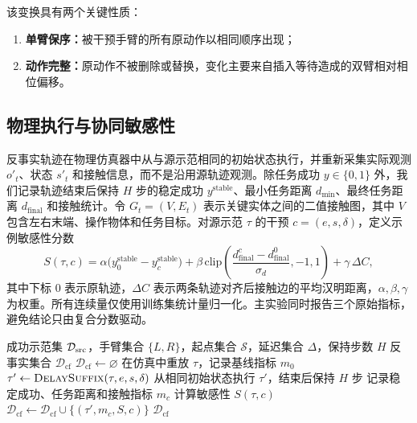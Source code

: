 该变换具有两个关键性质：
\begin{enumerate}
    \item \textbf{单臂保序：}被干预手臂的所有原动作以相同顺序出现；
    \item \textbf{动作完整：}原动作不被删除或替换，变化主要来自插入等待造成的双臂相对相位偏移。
\end{enumerate}

\subsection{物理执行与协同敏感性}

反事实轨迹在物理仿真器中从与源示范相同的初始状态执行，并重新采集实际观测 $o'_t$、状态 $s'_t$ 和接触信息，而不是沿用源轨迹观测。除任务成功 $y\in\{0,1\}$ 外，我们记录轨迹结束后保持 $H$ 步的稳定成功 $y^{\mathrm{stable}}$、最小任务距离 $d_{\min}$、最终任务距离 $d_{\mathrm{final}}$ 和接触统计。令 $G_t=(V,E_t)$ 表示关键实体之间的二值接触图，其中 $V$ 包含左右末端、操作物体和任务目标。对源示范 $\tau$ 的干预 $c=(e,s,\delta)$，定义示例敏感性分数
\begin{equation}
S(\tau,c)=
\alpha\big(y_0^{\mathrm{stable}}-y_c^{\mathrm{stable}}\big)
+\beta\,\mathrm{clip}\left(\frac{d_{\mathrm{final}}^c-d_{\mathrm{final}}^0}{\sigma_d},-1,1\right)
+\gamma\,\Delta C,
\end{equation}
其中下标 $0$ 表示原轨迹，$\Delta C$ 表示两条轨迹对齐后接触边的平均汉明距离，$\alpha,\beta,\gamma$ 为权重。所有连续量仅使用训练集统计量归一化。主实验同时报告三个原始指标，避免结论只由复合分数驱动。

\begin{algorithm}[t]
\caption{协同敏感反事实数据生成}
\label{alg:generation}
\begin{algorithmic}[1]
\Require 成功示范集 $\mathcal{D}_{\mathrm{src}}$，手臂集合 $\{L,R\}$，起点集合 $\mathcal{S}$，延迟集合 $\Delta$，保持步数 $H$
\Ensure 反事实集合 $\mathcal{D}_{\mathrm{cf}}$
\State $\mathcal{D}_{\mathrm{cf}}\gets\varnothing$
\ForAll{$\tau\in\Dsrc$}
    \State 在仿真中重放 $\tau$，记录基线指标 $m_0$
        \State $\tau'\gets\textsc{DelaySuffix}(\tau,e,s,\delta)$
        \State 从相同初始状态执行 $\tau'$，结束后保持 $H$ 步
        \State 记录稳定成功、任务距离和接触指标 $m_c$
        \State 计算敏感性 $S(\tau,c)$
        \State $\mathcal{D}_{\mathrm{cf}}\gets\mathcal{D}_{\mathrm{cf}}\cup\{(\tau',m_c,S,c)\}$
    \EndFor
\EndFor
\State \Return $\mathcal{D}_{\mathrm{cf}}$
\end{algorithmic}
\end{algorithm}

